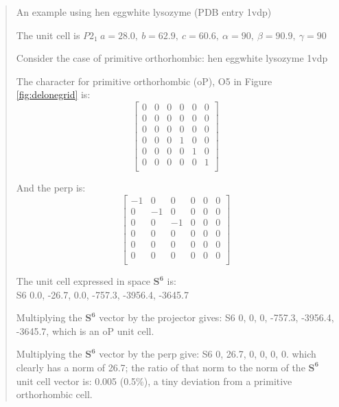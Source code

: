\documentclass[preprint]{iucr}              %
\newcommand{\SVI}[0]{$\mathbf{S^{6}}$}
\begin{document}
	\begin{quote}
		
		An example using hen eggwhite lysozyme (PDB entry 1vdp)
		
		
		The unit cell is $P2_1~a=28.0,~  b=62.9,~   c= 60.6,~ 
		\alpha=90,~ \beta=90.9,~    \gamma=90 $
		
		
		Consider the case of primitive orthorhombic:
		hen eggwhite lysozyme 1vdp
		
		
		
		The character for primitive orthorhombic (oP), O5 in Figure \ref{fig:delonegrid} is:
		\[
		\begin{bmatrix}
			0 & 0 & 0 & 0 & 0 & 0 \\
			0 & 0 & 0 & 0 & 0 & 0 \\
			0 & 0 & 0 & 0 & 0 & 0 \\
			0 & 0 & 0 & 1 & 0 & 0 \\
			0 & 0 & 0 & 0 & 1 & 0 \\
			0 & 0 & 0 & 0 & 0 & 1 \\
			
		\end{bmatrix}
		\]
		
		And the perp is:
		\[
		\begin{bmatrix}
			-1 & 0 & 0 & 0 & 0 & 0 \\
			0 & -1 & 0 & 0 & 0 & 0 \\
			0 & 0 & -1 & 0 & 0 & 0 \\
			0 & 0 & 0 & 0 & 0 & 0 \\
			0 & 0 & 0 & 0 & 0 & 0 \\
			0 & 0 & 0 & 0 & 0 & 0 \\
			
		\end{bmatrix}
		\]
		
		The unit cell expressed in space \SVI{} is:\\
		S6   0.0, -26.7,   0.0, -757.3, -3956.4, -3645.7
		
		Multiplying the \SVI{} vector by the projector gives:
		S6 0, 0, 0,  -757.3, -3956.4, -3645.7, which is an oP unit cell.
		
		Multiplying the \SVI{} vector by the perp give:
		S6 0, 26.7, 0, 0, 0, 0.
		which clearly has a norm of 26.7; the ratio of that norm
		to the norm of the \SVI{} unit cell vector is: 0.005 (0.5\%), a tiny deviation from a primitive orthorhombic cell.
		
		
	\end{quote}
	
\end{document}
